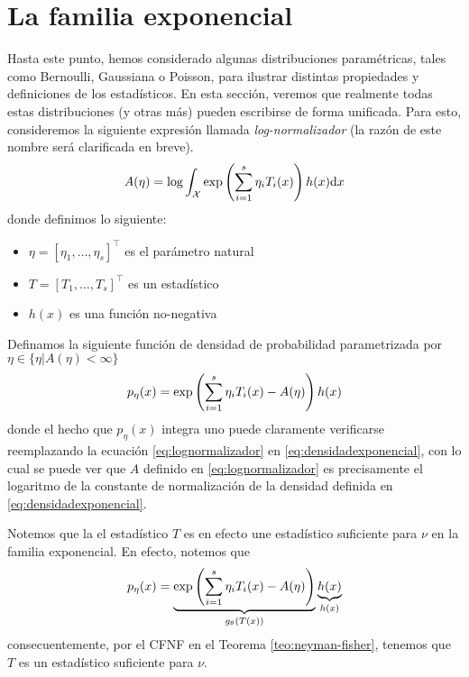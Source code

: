 \section{La familia exponencial}

Hasta este punto, hemos considerado algunas distribuciones paramétricas, tales como Bernoulli, Gaussiana o Poisson, para ilustrar distintas propiedades y definiciones de los estadísticos. En esta sección, veremos que realmente todas estas distribuciones (y otras más) pueden escribirse de forma unificada. Para esto, consideremos la siguiente expresión llamada \textit{log-normalizador} (la razón de este nombre será clarificada en breve).
\begin{equation}
	\label{eq:lognormalizador}
	A(\eta) = \log\int_{\mathcal X} \exp\left(\sum_{i=1}^s\eta_iT_i(x)\right)h(x){\text{d}x}
\end{equation}
donde definimos lo siguiente:
\begin{itemize}
	\item $\eta = [\eta_1,\ldots,\eta_s]^\top$ es el parámetro natural
	\item $T = [T_1,\ldots,T_s]^\top$ es un estadístico
	\item $h(x)$ es una función no-negativa
\end{itemize}
Definamos la siguiente función de densidad de probabilidad parametrizada por $\eta\in\{\eta | A(\eta)<\infty\}$
\begin{equation}
	\label{eq:densidadexponencial}
 	p_\eta(x) = \exp\left(\sum_{i=1}^s\eta_iT_i(x)-A(\eta)\right)h(x)
 \end{equation} 
 donde el hecho que $p_\eta(x)$ integra uno puede claramente verificarse reemplazando la ecuación \eqref{eq:lognormalizador} en \eqref{eq:densidadexponencial}, con lo cual se puede ver que $A$ definido en \eqref{eq:lognormalizador} es precisamente el logaritmo de la constante de normalización de la densidad definida en \eqref{eq:densidadexponencial}.

 Notemos que la el estadístico $T$ es en efecto une estadístico suficiente para $\nu$ en la familia exponencial. En efecto, notemos que 
 \begin{equation}
	\label{eq:densidadexponencial2}
 	p_\eta(x) = \underbrace{\exp\left(\sum_{i=1}^s\eta_iT_i(x)-A(\eta)\right)}_{g_\theta(T(x))}\underbrace{h(x)}_{h(x)}
 \end{equation} 
consecuentemente, por el CFNF en el Teorema \ref{teo:neyman-fisher}, tenemos que $T$ es 
un estadístico suficiente para $\nu$.





